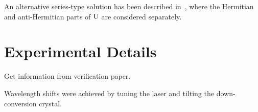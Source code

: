 An alternative series-type solution has been described in~\cite{hamiltomo-ulm},
where the Hermitian and anti-Hermitian parts of \(\mathrm{U}\) are considered
separately.

\section{Experimental Details}
\label{sec:HamiltomoExperiment}
Get information from verification paper.

Wavelength shifts were achieved by tuning the laser and tilting the
down-conversion crystal.



